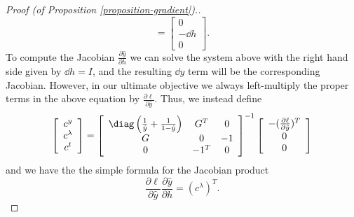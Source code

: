 \begin{proof}[Proof (of Proposition \ref{proposition-gradient}).]
\begin{equation}
= \left [ \begin{array}{c} 0 \\ -\dd h \\ 0 \end{array} \right ].
\end{equation}
To compute the Jacobian $\frac{\partial \hat{y}}{\partial h}$ we can solve the
system above with the right hand side given by $\dd h = I$, and the resulting
$\dd y$ term will be the corresponding Jacobian.  However, in our ultimate
objective we always left-multiply the proper terms in the above equation by
$\frac{\partial \ell}{\partial \hat{y}}$.  Thus, we instead define
{\small
\begin{equation}
\left [ \begin{array}{c} c^y \\ c^\lambda \\ c^t \end{array} \right ]
 = \left [ \begin{array}{ccc}
\diag\left(\frac{1}{\hat y} + \frac{1}{1-\hat y}\right) & G^T & 0 \\
G & 0 & -1 \\
0 & -1^T & 0 \end{array} \right ]^{-1}
\left [ \begin{array}{c} -(\frac{\partial \ell}{\partial \hat y})^T \\ 0 \\ 0
\end{array} \right ]
\end{equation}
}
and we have the the simple formula for the Jacobian product
\begin{equation}
\frac{\partial \ell}{\partial \hat{y}} \frac{\partial \hat{y}}{\partial h} =
(c^\lambda)^T.
\end{equation}


\end{proof}
